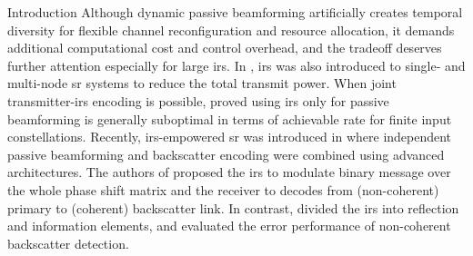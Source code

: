 \documentclass[journal]{IEEEtran}
\begin{document}
\begin{section}{Introduction}
	Although dynamic passive beamforming artificially creates temporal diversity for flexible channel reconfiguration and resource allocation, it demands additional computational cost and control overhead, and the tradeoff deserves further attention especially for large \gls{irs}.
	In \cite{Chen2021,Zhang2021d}, \gls{irs} was also introduced to single- and multi-node \gls{sr} systems to reduce the total transmit power.
	When joint transmitter-\gls{irs} encoding is possible, \cite{Karasik2019} proved using \gls{irs} only for passive beamforming is generally suboptimal in terms of achievable rate for finite input constellations.
	Recently, \gls{irs}-empowered \gls{sr} was introduced in \cite{Xu2020b,Hua2022,Hu2021a} where independent passive beamforming and backscatter encoding were combined using advanced architectures.
	The authors of \cite{Xu2020b,Hua2022} proposed the \gls{irs} to modulate binary message over the whole phase shift matrix and the receiver to decodes from (non-coherent) primary to (coherent) backscatter link.
	In contrast, \cite{Hu2021a} divided the \gls{irs} into reflection and information elements, and evaluated the error performance of non-coherent backscatter detection.


\end{section}
\end{document}
